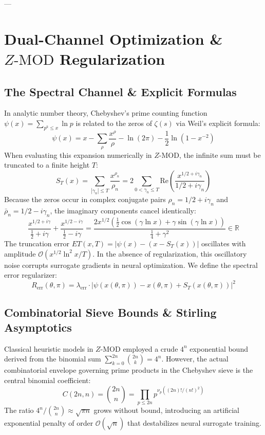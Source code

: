 \documentclass[11pt,a4paper]{article}
\theoremstyle{definition}
\theoremstyle{remark}
\begin{document}
---

\section{Dual-Channel Optimization \& \texorpdfstring{$Z\text{-MOD}$}{Z-MOD} Regularization}

\subsection{The Spectral Channel \& Explicit Formulas}
In analytic number theory, Chebyshev's prime counting function $\psi(x) = \sum_{p^k \le x} \ln p$ is related to the zeros of $\zeta(s)$ via Weil's explicit formula:
\begin{equation}
\psi(x) = x - \sum_{\rho} \frac{x^\rho}{\rho} - \ln(2\pi) - \frac{1}{2}\ln(1 - x^{-2})
\end{equation}
When evaluating this expansion numerically in $Z\text{-MOD}$, the infinite sum must be truncated to a finite height $T$:
\begin{equation}
S_T(x) = \sum_{|\gamma_n| \le T} \frac{x^{\rho_n}}{\rho_n} = 2 \sum_{0 < \gamma_n \le T} \mathrm{Re}\left(\frac{x^{1/2 + i\gamma_n}}{1/2 + i\gamma_n}\right)
\end{equation}
Because the zeros occur in complex conjugate pairs $\rho_n = 1/2 + i\gamma_n$ and $\bar{\rho}_n = 1/2 - i\gamma_n$, the imaginary components cancel identically:
\begin{equation}
\frac{x^{1/2 + i\gamma}}{\frac{1}{2} + i\gamma} + \frac{x^{1/2 - i\gamma}}{\frac{1}{2} - i\gamma} = \frac{2 x^{1/2}\left(\frac{1}{2}\cos(\gamma \ln x) + \gamma \sin(\gamma \ln x)\right)}{\frac{1}{4} + \gamma^2} \in \mathbb{R}
\end{equation}
The truncation error $ET(x, T) = |\psi(x) - (x - S_T(x))|$ oscillates with amplitude $\mathcal{O}(x^{1/2} \ln^2 x / T)$. In the absence of regularization, this oscillatory noise corrupts surrogate gradients in neural optimization. We define the spectral error regularizer:
\begin{equation}
R_{\mathrm{err}}(\theta, \pi) = \lambda_{\mathrm{err}} \cdot \left| \psi(x(\theta, \pi)) - x(\theta, \pi) + S_T(x(\theta, \pi)) \right|^2
\end{equation}

\subsection{Combinatorial Sieve Bounds \& Stirling Asymptotics}
Classical heuristic models in $Z\text{-MOD}$ employed a crude $4^n$ exponential bound derived from the binomial sum $\sum_{k=0}^{2n} \binom{2n}{k} = 4^n$. However, the actual combinatorial envelope governing prime products in the Chebyshev sieve is the central binomial coefficient:
\begin{equation}
C(2n, n) = \binom{2n}{n} = \prod_{p \le 2n} p^{\nu_p((2n)! / (n!)^2)}
\end{equation}
The ratio $4^n / \binom{2n}{n} \approx \sqrt{\pi n}$ grows without bound, introducing an artificial exponential penalty of order $\mathcal{O}(\sqrt{n})$ that destabilizes neural surrogate training.
\end{document}
